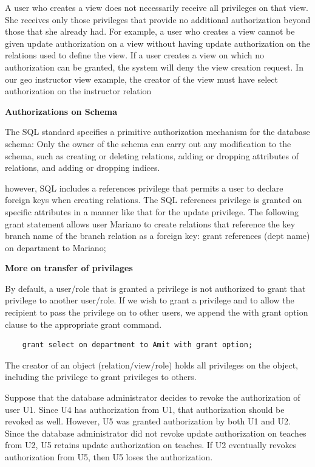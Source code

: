 \documentclass[8pt, a4paper, oneside, twocolumn]{extarticle}
\begin{document}
A user who creates a view does not necessarily receive all privileges on that
view. She receives only those privileges that provide no additional authorization
beyond those that she already had. For example, a user who creates a view cannot
be given update authorization on a view without having update authorization
on the relations used to define the view. If a user creates a view on which no
authorization can be granted, the system will deny the view creation request.
In our geo instructor view example, the creator of the view must have select
authorization on the instructor relation

\textbf{Authorizations on Schema}

The SQL standard specifies a primitive authorization mechanism for the database
schema: Only the owner of the schema can carry out any modification to the
schema, such as creating or deleting relations, adding or dropping attributes of
relations, and adding or dropping indices.

however, SQL includes a references privilege that permits a user to declare
foreign keys when creating relations. The SQL references privilege is granted on
specific attributes in a manner like that for the update privilege. The following
grant statement allows user Mariano to create relations that reference the key
branch name of the branch relation as a foreign key:
grant references (dept name) on department to Mariano;

\textbf{More on transfer of privilages}

By default, a user/role that is granted a
privilege is not authorized to grant that privilege to another user/role. If we wish
to grant a privilege and to allow the recipient to pass the privilege on to other
users, we append the with grant option clause to the appropriate grant command.
\begin{verbatim}
    grant select on department to Amit with grant option;
\end{verbatim}

The creator of an object (relation/view/role) holds all privileges on the object,
including the privilege to grant privileges to others.

Suppose that the database administrator decides to revoke the authorization of
user U1. Since U4 has authorization from U1, that authorization should be revoked
as well. However, U5 was granted authorization by both U1 and U2. Since the
database administrator did not revoke update authorization on teaches from U2,
U5 retains update authorization on teaches. If U2 eventually revokes authorization
from U5, then U5 loses the authorization.
\end{document}
